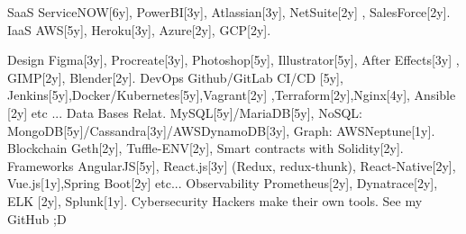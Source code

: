 \vspace{5mm}

\begin{cvskills}
	\cvskill
	{SaaS} %
	{ ServiceNOW[6y], PowerBI[3y], Atlassian[3y], NetSuite[2y] , SalesForce[2y]. } %
	\cvskill
	{IaaS} %
	{ AWS[5y], Heroku[3y], Azure[2y], GCP[2y]. } %
	
	\cvskill
	{Design} %
	{Figma[3y], Procreate[3y], Photoshop[5y], Illustrator[5y], After Effects[3y] , GIMP[2y], Blender[2y].} %
	\cvskill
	{DevOps} %
	{Github/GitLab CI/CD [5y], Jenkins[5y],Docker/Kubernetes[5y],Vagrant[2y] ,Terraform[2y],Nginx[4y], Ansible [2y] etc ...} %
	\cvskill
	{Data Bases} %
	{Relat. MySQL[5y]/MariaDB[5y], NoSQL: MongoDB[5y]/Cassandra[3y]/AWSDynamoDB[3y], Graph: AWSNeptune[1y].} %
	\cvskill
	{Blockchain} %
	{ Geth[2y], Tuffle-ENV[2y], Smart contracts with Solidity[2y].} %
	\cvskill
	{Frameworks} %
	{ AngularJS[5y], React.js[3y] (Redux, redux-thunk), React-Native[2y], Vue.js[1y],Spring Boot[2y] etc...}
	\cvskill
	{Observability} %
	{Prometheus[2y], Dynatrace[2y], ELK [2y], Splunk[1y]. } %
	\cvskill
	{Cybersecurity} %
	{Hackers make their own tools. See my GitHub ;D} %
	

\end{cvskills}
